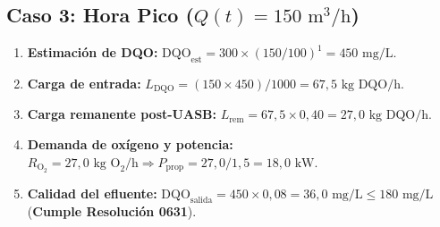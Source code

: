 \documentclass[11pt, a4paper]{article}
\begin{document}
\subsection{Caso 3: Hora Pico ($Q(t) = 150\text{ m}^3/\text{h}$)}
\begin{enumerate}
    \item \textbf{Estimación de DQO:} $\text{DQO}_{\text{est}} = 300 \times (150/100)^1 = 450\text{ mg/L}$.
    \item \textbf{Carga de entrada:} $L_{\text{DQO}} = (150 \times 450)/1000 = 67{,}5\text{ kg DQO/h}$.
    \item \textbf{Carga remanente post-UASB:} $L_{\text{rem}} = 67{,}5 \times 0{,}40 = 27{,}0\text{ kg DQO/h}$.
    \item \textbf{Demanda de oxígeno y potencia:} $R_{\text{O}_2} = 27{,}0\text{ kg O}_2/\text{h} \Rightarrow P_{\text{prop}} = 27{,}0 / 1{,}5 = 18{,}0\text{ kW}$.
    \item \textbf{Calidad del efluente:} $\text{DQO}_{\text{salida}} = 450 \times 0{,}08 = 36{,}0\text{ mg/L} \le 180\text{ mg/L}$ (\textbf{Cumple Resolución 0631}).
\end{enumerate}
\end{document}
